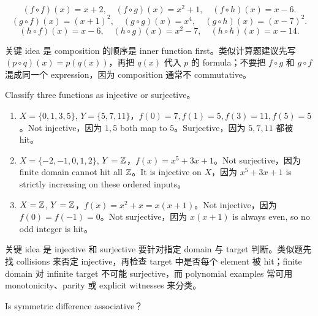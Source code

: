 \begin{solution}
\[
(f\circ f)(x)=x+2,\quad (f\circ g)(x)=x^2+1,\quad (f\circ h)(x)=x-6.
\]
\[
(g\circ f)(x)=(x+1)^2,\quad (g\circ g)(x)=x^4,\quad (g\circ h)(x)=(x-7)^2.
\]
\[
(h\circ f)(x)=x-6,\quad (h\circ g)(x)=x^2-7,\quad (h\circ h)(x)=x-14.
\]
\end{solution}

\begin{explanation}
关键 idea 是 composition 的顺序是 inner function first。类似计算题建议先写 \((p\circ q)(x)=p(q(x))\)，再把 \(q(x)\) 代入 \(p\) 的 formula；不要把 \(f\circ g\) 和 \(g\circ f\) 混成同一个 expression，因为 composition 通常不 commutative。
\end{explanation}

\begin{exerciseblock}
Classify three functions as injective or surjective。
\end{exerciseblock}

\begin{solution}
\begin{enumerate}[label=(\alph*)]
  \item \(X=\{0,1,3,5\}\), \(Y=\{5,7,11\}\)，\(f(0)=7,f(1)=5,f(3)=11,f(5)=5\)。Not injective，因为 \(1,5\) both map to \(5\)。Surjective，因为 \(5,7,11\) 都被 hit。
  \item \(X=\{-2,-1,0,1,2\}\), \(Y=\mathbb{Z}\)，\(f(x)=x^5+3x+1\)。Not surjective，因为 finite domain cannot hit all \(\mathbb{Z}\)。It is injective on \(X\)，因为 \(x^5+3x+1\) is strictly increasing on these ordered inputs。
  \item \(X=\mathbb{Z}\), \(Y=\mathbb{Z}\)，\(f(x)=x^2+x=x(x+1)\)。Not injective，因为 \(f(0)=f(-1)=0\)。Not surjective，因为 \(x(x+1)\) is always even, so no odd integer is hit。
\end{enumerate}
\end{solution}

\begin{explanation}
关键 idea 是 injective 和 surjective 要针对指定 domain 与 target 判断。类似题先找 collisions 来否定 injective，再检查 target 中是否每个 element 被 hit；finite domain 对 infinite target 不可能 surjective，而 polynomial examples 常可用 monotonicity、parity 或 explicit witnesses 来分类。
\end{explanation}

\begin{exerciseblock}
Is symmetric difference associative？
\end{exerciseblock}


